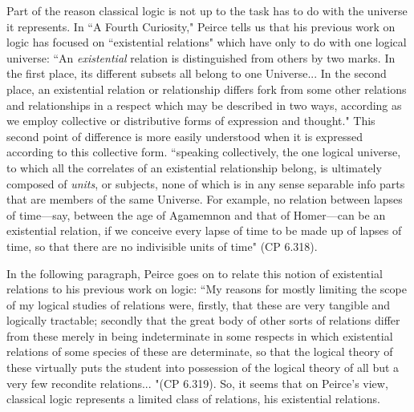 \documentclass[12pt]{article}
\begin{document}
Part of the reason classical logic is not up to the task has to do with the universe it represents. In ``A Fourth Curiosity," Peirce tells us that his previous work on logic has focused on ``existential relations" which have only to do with one logical universe: ``An \textit{existential} relation is distinguished from others by two marks. In the first place, its different subsets all belong to one Universe... In the second place, an existential relation or relationship differs fork from some other relations and relationships in a respect which may be described in two ways, according as we employ collective or distributive forms of expression and thought." This second point of difference is more easily understood when it is expressed according to this collective form. ``speaking collectively, the one logical universe, to which all the correlates of an existential relationship belong, is ultimately composed of \textit{units}, or subjects, none of which is in any sense separable info parts that are members of the same Universe. For example, no relation between lapses of time---say, between the age of Agamemnon and that of Homer---can be an existential relation, if we conceive every lapse of time to be made up of lapses of time, so that there are no indivisible units of time" (CP 6.318). 

In the following paragraph, Peirce goes on to relate this notion of existential relations to his previous work on logic: ``My reasons for mostly limiting the scope of my logical studies of relations were, firstly, that these are very tangible and logically tractable; secondly that the great body of other sorts of relations differ from these merely in being indeterminate in some respects in which existential relations of some species of these are determinate, so that the logical theory of these virtually puts the student into possession of the logical theory of all but a very few recondite relations... "(CP 6.319). So, it seems that on Peirce's view, classical logic represents a limited class of relations, his existential relations. 
\end{document}
